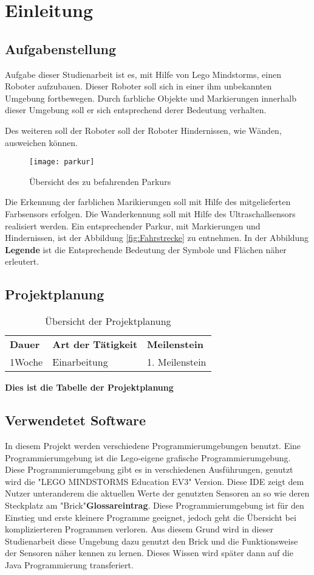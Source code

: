 \chapter{Einleitung}
\section{Aufgabenstellung}

Aufgabe dieser Studienarbeit ist es, mit Hilfe von Lego Mindstorms, einen Roboter aufzubauen. Dieser Roboter soll sich in einer ihm unbekannten Umgebung fortbewegen. Durch farbliche Objekte und Markierungen innerhalb dieser Umgebung soll er sich entsprechend derer Bedeutung verhalten. 

Des weiteren soll der Roboter soll der Roboter Hindernissen, wie Wänden, ausweichen können. 
\begin{figure}[htb]
\centering
\texttt{[image: parkur]}
\caption{Übersicht des zu befahrenden Parkurs}
\label{fig:Fahrstrecke}
\end{figure}

Die Erkennung der farblichen Marikierungen soll mit Hilfe des mitgelieferten Farbsensors erfolgen. Die Wanderkennung soll mit Hilfe des Ultraschallsensors realisiert werden. 
Ein entsprechender Parkur, mit Markierungen und Hindernissen, ist der Abbildung \vref{fig:Fahrstrecke} zu entnehmen. In der Abbildung \textbf{Legende} ist die Entsprechende Bedeutung der Symbole und Flächen näher erleutert.


\section{Projektplanung}
\begin{table}[htp]
\centering
\begin{tabularx}{\textwidth}{|X|X|X|}
\cline{1-3}
  \textbf{ Dauer}&\textbf{Art der Tätigkeit}&\textbf{Meilenstein} \\\cline{1-3}
  1Woche& Einarbeitung & 1. Meilenstein\\\cline{1-3}
\end{tabularx}
\caption{Übersicht der Projektplanung}
\label{tab:projektplaung}
\end{table}
\textbf{Dies ist die Tabelle der Projektplanung}

\section{Verwendetet Software}
In diesem Projekt werden verschiedene Programmierumgebungen benutzt. Eine Programmierumgebung ist die Lego-eigene grafische Programmierumgebung. Diese Programmierumgebung gibt es in verschiedenen Ausführungen, genutzt wird die "LEGO MINDSTORMS Education EV3" Version. Diese IDE zeigt dem Nutzer unteranderem die aktuellen Werte der genutzten Sensoren an so wie deren Steckplatz am "Brick"\textbf{Glossareintrag}. Diese Programmierumgebung ist für den Einstieg und erste kleinere Programme geeignet, jedoch geht die Übersicht bei komplizierteren Programmen verloren. Aus diesem Grund wird in dieser Studienarbeit diese Umgebung dazu genutzt den Brick und die Funktionsweise der Sensoren näher kennen zu lernen. Dieses Wissen wird später dann auf die Java Programmierung transferiert.

